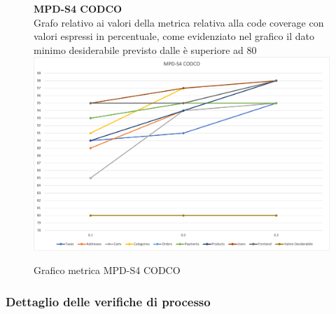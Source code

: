 \begin{center}
\begin{center}
    \end{center}




    \begin{figure}[!htb]
        \centering
        \textbf{MPD-S4 CODCO} \\
        Grafo relativo ai valori della metrica relativa alla code coverage con valori espressi in percentuale, come evidenziato nel 
        grafico il dato minimo desiderabile previsto dalle  è superiore ad 80
        \includegraphics[scale=0.60]{res/images/RQcodco.png}
        \caption{Grafico metrica MPD-S4 CODCO}
    \end{figure}
    \begin{center}
        
    \end{center}


\end{center}











\subsubsection{Dettaglio delle verifiche di processo}

